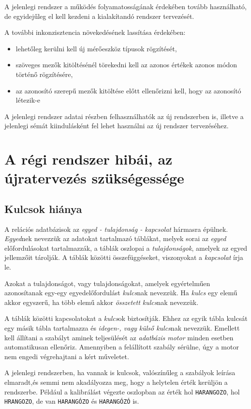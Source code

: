 \documentclass[a4paper,12pt]{report}
\begin{document}
A jelenlegi rendszer a működés folyamatosságának érdekében tovább használható, 
de egyidejűleg el kell kezdeni a kialakítandó rendszer tervezését.

A további inkonzisztencia növekedésének lassítása érdekében:
\begin{itemize}
\item lehetőleg kerülni kell új mérőeszköz típusok rögzítését,
\item  szöveges mezők kitöltésénél törekedni kell az azonos értékek azonos módon
történő rögzítésére,
\item az azonosító szerepű mezők kitöltése előtt ellenőrizni kell, hogy az 
azonosító létezik-e
\end{itemize}

A jelenlegi rendszer adatai részben felhasználhatók az új rendszerben is, 
illetve a jelenlegi sémát kiindulásként fel lehet használni az új rendszer 
tervezéséhez.

\section{A régi rendszer hibái, az újratervezés szükségessége}

\subsection{Kulcsok hiánya}
A relációs adatbázisok az \textit{egyed - tulajdonság - kapcsolat} hármasra
épülnek. \textit{Egyed}nek nevezzük az adatokat tartalmazó táblákat, melyek 
sorai az \textit{egyed} előfordulásokat tartalmazzák, a táblák oszlopai a 
\textit{tulajdonságok}, amelyek az egyed jellemzőit tárolják. A táblák 
közötti összefüggéseket, viszonyokat a \textit{kapcsolat} írja le.

Azokat a tulajdonságot, vagy tulajdonságokat, amelyek egyértelműen azonosítanak
egy-egy egyedelőfordulást \textit{kulcs}nak nevezzük. Ha \textit{kulcs} egy 
elemű akkor egyszerű, ha több elemű akkor \textit{összetett kulcs}nak nevezzük.

A táblák közötti kapcsolatokat a \textit{kulcs}ok biztosítják. Ehhez az egyik 
tábla kulcsát egy másik tábla tartalmazza és \textit{idegen-, vagy külső 
kulcs}nak nevezzük. Emellett kell állítani a szabályt aminek teljesülését az 
\textit{adatbázis motor} minden esetben automatikusan ellenőriz. Amennyiben a 
felállított szabály sérülne, úgy a motor nem engedi végrehajtani a kért 
műveletet.

A jelenlegi rendszerben, ha vannak is kulcsok, valószínűleg a szabályok leírása 
elmaradt,és semmi nem akadályozza meg, hogy a helytelen érték kerüljön a 
rendszerbe. Például a kalibrálást végezte oszlopban az érték hol 
\texttt{HARANGOZO}, hol \texttt{HRANGOZO}, de van \texttt{HARANGÓZO} és 
\texttt{HARANGÓZÓ} is.
\end{document}
